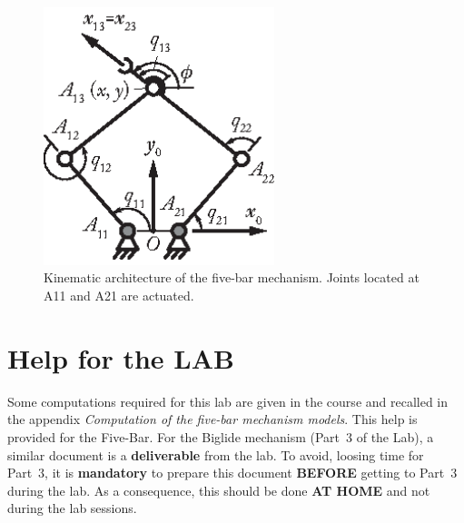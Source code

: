 \documentclass[a4paper]{article}
\begin{document}
\begin{figure}[h!]
\centering
\includegraphics[width=0.6\textwidth]{RuRRRRu_kin.eps}
\caption{Kinematic architecture of the five-bar mechanism. Joints located at A11 and A21 are actuated.}
\label{fig:5bar}
\end{figure}


\section{Help for the LAB} 
Some computations required for this lab are given in the course and recalled in the appendix \textit{Computation of the five-bar mechanism models}. This help is provided for the Five-Bar. For the Biglide mechanism (Part~3 of the Lab), a similar document is a \textbf{deliverable} from the lab. To avoid, loosing time for Part~3, it is \textbf{mandatory} to prepare this document \textbf{BEFORE} getting to Part~3 during the lab. As a consequence, this should be done \textbf{AT HOME} and not during the lab sessions.
\end{document}
